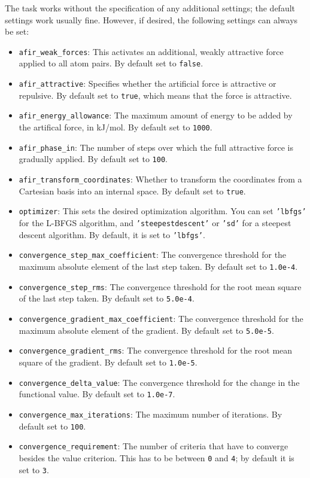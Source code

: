 \documentclass[]{tufte-book}
\begin{document}
The task works without the specification of any additional settings; the default settings work usually fine. However,
if desired, the following settings can always be set:
\begin{itemize}
\item \texttt{afir\_weak\_forces}: This activates an additional, weakly attractive force applied to all atom pairs. By 
default set to \texttt{false}.
\item \texttt{afir\_attractive}: Specifies whether the artificial force is attractive or repulsive. By default set to
\texttt{true}, which means that the force is attractive.
\item \texttt{afir\_energy\_allowance}: The maximum amount of energy to be added by the artifical force, in kJ/mol.
By default set to \texttt{1000}.
\item \texttt{afir\_phase\_in}: The number of steps over which the full attractive force is gradually applied. By default
set to \texttt{100}.
\item \texttt{afir\_transform\_coordinates}: Whether to transform the coordinates from a Cartesian basis into an internal 
space. By default set to \texttt{true}.
\item \texttt{optimizer}: This sets the desired optimization algorithm. You can set \texttt{'lbfgs'} for the L-BFGS algorithm, and
\texttt{'steepestdescent'} or \texttt{'sd'} for a steepest descent algorithm. By default, it is set to \texttt{'lbfgs'}.
\item \texttt{convergence\_step\_max\_coefficient}: The convergence threshold for the maximum absolute element of the last step taken.
By default set to \texttt{1.0e-4}.
\item \texttt{convergence\_step\_rms}: The convergence threshold for the root mean square of the last step taken. By default set to 
\texttt{5.0e-4}.
\item \texttt{convergence\_gradient\_max\_coefficient}: The convergence threshold for the maximum absolute element of the gradient. 
By default set to \texttt{5.0e-5}.
\item \texttt{convergence\_gradient\_rms}: The convergence threshold for the root mean square of the gradient. By default set to 
\texttt{1.0e-5}.
\item \texttt{convergence\_delta\_value}: The convergence threshold for the change in the functional value. By default set to
\texttt{1.0e-7}.
\item \texttt{convergence\_max\_iterations}: The maximum number of iterations. By default set to \texttt{100}.
\item \texttt{convergence\_requirement}: The number of criteria that have to converge besides the value criterion. This 
has to be between \texttt{0} and \texttt{4}; by default it is set to \texttt{3}.
\end{itemize}
\end{document}
